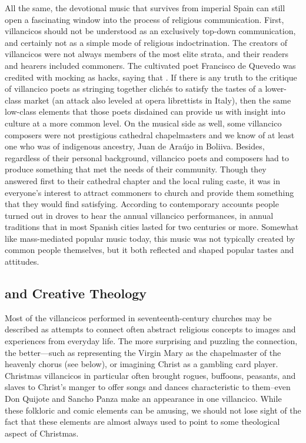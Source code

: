 All the same, the devotional music that survives from imperial Spain
can still open a fascinating window into the process of religious communication.
First, villancicos should not be understood as an exclusively top-down
communication, and certainly not as a simple mode of religious indoctrination.
The creators of villancicos were not always members of the most elite strata,
and their readers and hearers included commoners.
The cultivated poet Francisco de Quevedo was credited with mocking  as hacks, saying that .%
    \Autocite[37]{Torres:SuenosMorales}
If there is any truth to the critique of villancico poets as stringing together
clichés to satisfy the tastes of a lower-class market (an attack also leveled at
opera librettists in Italy), then the same low-class elements that those poets
disdained can provide us with insight into culture at a more common level.
On the musical side as well, some villancico composers were not prestigious
cathedral chapelmasters and we know of at least one who was of indigenous
ancestry, Juan de Araújo in Boliiva.%
    \Autocite{Illari:Popular}
Besides, regardless of their personal background, villancico poets and composers
had to produce something that met the needs of their community. 
Though they answered first to their cathedral chapter and the local ruling
caste, it was in everyone's interest to attract commoners to church and provide
them something that they would find satisfying.
According to contemporary accounts people turned out in droves to hear the
annual villancico performances, in annual traditions that in most Spanish
cities lasted for two centuries or more.%
Somewhat like mass-mediated popular music today, this music was not typically
created by common people themselves, but it both reflected and shaped popular
tastes and attitudes.

\subsection{ and Creative Theology}

Most of the villancicos performed in seventeenth-century churches may be
described as attempts to connect often abstract religious concepts to images
and experiences from everyday life.
The more surprising and puzzling the connection, the better---such as
representing the Virgin Mary as the chapelmaster of the heavenly chorus (see
below), or imagining Christ as a gambling card player.%
    \Autocite{Cashner:PlayingCards}
Christmas villancicos in particular often brought rogues, buffoons, peasants,
and slaves to Christ's manger to offer songs and dances characteristic to
them--even Don Quijote and Sancho Panza make an appearance in one villancico.%
While these folkloric and comic elements can be amusing, we should not lose
sight of the fact that these elements are almost always used to point to some
theological aspect of Christmas.

